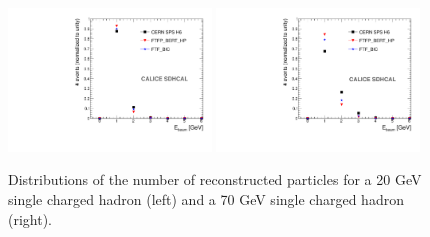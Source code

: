 \documentclass[cits]{JINST}
\begin{document}
\begin{figure}[!h]
  \begin{center}
    \includegraphics[width=0.48\textwidth]{plots/SingleParticle/CALICESDHCAL/MC_DATA_COMP/Single_MC_DATA_COMP_NPfos_20GeV.pdf}
    \includegraphics[width=0.48\textwidth]{plots/SingleParticle/CALICESDHCAL/MC_DATA_COMP/Single_MC_DATA_COMP_NPfos_70GeV.pdf} \\
  \end{center}
  \caption{\label{ARBOR_SINGLE_PARTICLE_NPFOS_20_AND_70_GEV} Distributions of the number of reconstructed particles for a 20 GeV single charged hadron (left) and a 70 GeV single charged hadron (right).}
\end{figure}
\end{document}
